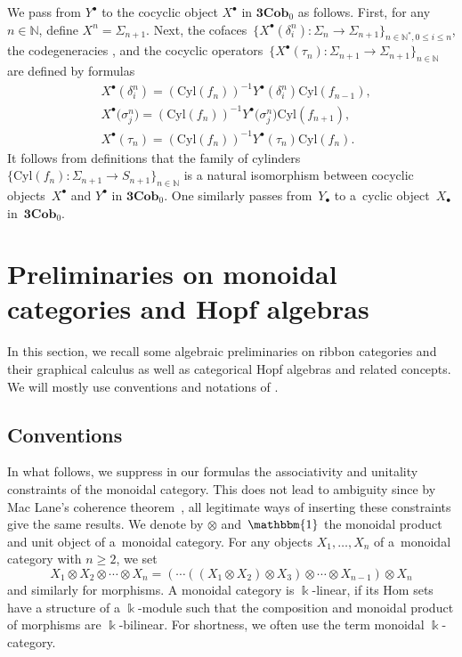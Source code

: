 \documentclass[pdftex]{sigma}
\numberwithin{equation}{section}
\newcommand{\co}{\colon}
\newcommand{\tens}{\otimes}
\newcommand{\N}{\mathbb{N}}
\newcommand{\Cyl}{\mathrm{Cyl}}
\newcommand{\Cob}{\textbf{Cob}}
\newcommand{\kk}{\Bbbk}
\newcommand{\uu}{\mathbbm{1}}
\begin{document}
We pass from $Y^\bullet$ to the cocyclic object $X^\bullet$ in $\textbf{3}\Cob_0$ as follows.
First, for any $n\in \N$, define $X^n=\Sigma_{n+1}$.
Next, the cofaces~$\{X^\bullet(\delta_i^n) \co \Sigma_n \to \Sigma_{n+1}\}_{n\in \N^*, 0\le i \le n}$, the codegeneracies \smash{$\bigl\{X^\bullet\bigl(\sigma_j^n\bigr) \co \Sigma_{n+2} \to \Sigma_{n+1}\bigr\}_{n\in \N, 0\le j \le n}$}, and the cocyclic operators~$\{X^\bullet(\tau_n) \co \Sigma_{n+1} \to \Sigma_{n+1}\}_{n\in\N}$ are defined by formulas
\begin{align*}
	&X^\bullet(\delta_i^n)=(\Cyl({f_n}))^{-1}Y^\bullet(\delta_i^n)\Cyl({f_{n-1}}), \\
	&X^\bullet\bigl(\sigma_j^n\bigr)=(\Cyl({f_n}))^{-1}Y^\bullet\bigl(\sigma_j^n\bigr)\Cyl({f_{n+1}}), \\
	&X^\bullet(\tau_n)=(\Cyl({f_n}))^{-1}Y^\bullet(\tau_n)\Cyl({f_n}).
\end{align*}
It follows from definitions that the family of cylinders~$\{\Cyl({f_n})\co \Sigma_{n+1} \to S_{n+1}\}_{n\in \N}$ is a natural isomorphism between cocyclic objects~$X^\bullet$ and $Y^\bullet$ in $\textbf{3}\Cob_0$. One similarly passes from~$Y_\bullet$ to a~cyclic object~$X_\bullet$ in~$\textbf{3}\Cob_0$.

\section{Preliminaries on monoidal categories and Hopf algebras}\label{catprelimini}

In this section, we recall some algebraic preliminaries on ribbon categories and their graphical calculus as well as categorical Hopf algebras and related concepts. We will mostly use conventions and notations of \cite{moncatstft}.

\subsection{Conventions} In what follows, we suppress in our formulas the associativity and unitality constraints of the monoidal category. This does not lead to ambiguity since by Mac Lane's coherence
theorem~\cite{maclane63}, all legitimate ways of inserting these constraints give the same results. We denote by $\tens$ and~$\uu$ the monoidal product and unit object of a~monoidal category. For any objects $X_1, \dots, X_n$ of a~monoidal category with $n\ge 2$, we set
\[
X_1 \tens X_2 \tens \cdots \tens X_n=(\cdots ((X_1\tens X_2)\tens X_3)\tens \cdots \tens X_{n-1} )\tens X_n
\]
and similarly for morphisms.
A monoidal category is $\kk$-linear, if its Hom sets have a structure of a $\kk$-module such that the composition and monoidal product of morphisms are $\kk$-bilinear. For shortness, we often use the term monoidal $\kk$-category.
\end{document}
